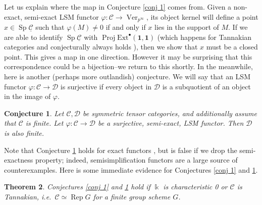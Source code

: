 \documentclass[11pt]{amsart}
\def\Cs{\mathcal{C}}
\def\Cs{\mathscr{C}}
\def\Ds{\mathscr{D}}
\def\Rep{\operatorname{Rep}}
\def\Ver{\operatorname{Ver}}
\def\Ext{\text{Ext}}
\def\ul{\underline}
\def\Sp{\operatorname{Sp}}
\def\Proj{\operatorname{Proj}}
\newtheorem{thm}{Theorem}[section]
\newtheorem{conj}[thm]{Conjecture}
\theoremstyle{definition}
\theoremstyle{remark}
\numberwithin{equation}{section}
\begin{document}
Let us explain where the map in Conjecture \ref{conj 1} comes from.  Given a non-exact, semi-exact LSM functor $\varphi:\Cs\to\Ver_{p^\infty}$, its object kernel will define a point $x\in\Sp\ul{\Cs}$ such that $\varphi(M)\neq 0$ if and only if $x$ lies in the support of $M$.  If we are able to identify $\Sp\ul{\Cs}$ with $\Proj \Ext^\bullet(\mathbf{1},\mathbf{1})$ (which happens for Tannakian categories \cite{BIKP} and conjecturally always holds \cite{NVY}), then we show that $x$ must be a closed point.  This gives a map in one direction.  However it may be surprising that this correspondence could be a bijection--we return to this shortly.  In the meanwhile, here is another (perhaps more outlandish) conjecture.  We will say that an LSM functor $\varphi:\Cs\to\Ds$ is surjective if every object in $\Ds$ is a subquotient of an object in the image of $\varphi$.

\begin{conj}\label{conj 2}
     Let $\Cs,\Ds$ be symmetric tensor categories, and additionally assume that $\Cs$ is finite.  Let $\varphi:\Cs\to\Ds$ be a surjective, semi-exact, LSM functor.  Then $\Ds$ is also finite.
\end{conj}

Note that Conjecture \ref{conj 2} holds for exact functors \cite[Prop.~1.8.19]{EGNO}, but is false if we drop the semi-exactness property; indeed, semisimplification functors are a large source of counterexamples.  Here is some immediate evidence for Conjectures \ref{conj 1} and \ref{conj 2}.

\begin{thm}\label{thm intro}
    Conjectures \ref{conj 1} and \ref{conj 2} hold if $\Bbbk$ is characteristic 0 or $\Cs$ is Tannakian, i.e.~$\Cs\simeq\Rep G$ for a finite group scheme $G$.
\end{thm}
\end{document}
